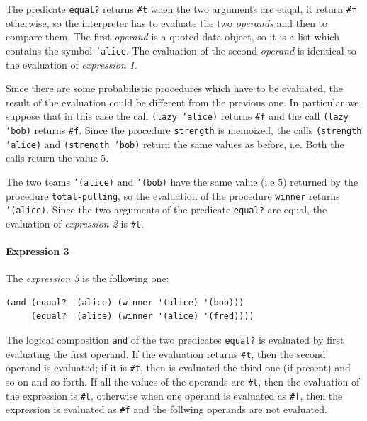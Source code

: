 \begin{itemize}
        The predicate \texttt{equal?} returns \texttt{\#t} when the two arguments are euqal, it return \texttt{\#f} otherwise, so
        the interpreter has to evaluate the two \textit{operands} and then to compare them. The first \textit{operand} is a quoted
        data object, so it is a list which contains the symbol \texttt{'alice}. The evaluation of the second \textit{operand} is
        identical to the evaluation of \textit{expression 1}. 
        
        Since there are some probabilistic procedures which have to be evaluated, the result of the evaluation could be different 
        from the previous one. In particular we suppose that in this case the call \texttt{(lazy 'alice)} returns \texttt{\#f} and 
        the call \texttt{(lazy 'bob)} returns \texttt{\#f}.
        Since the procedure \texttt{strength} is memoized, the calls \texttt{(strength 'alice)} and \texttt{(strength 'bob)} return
        the same values as before, i.e. Both the calls return the value $5$.
        
        The two teams \texttt{'(alice)} and \texttt{'(bob)} have the same value (i.e $5$) returned by the procedure 
        \texttt{total-pulling}, so the evaluation of the procedure \texttt{winner} returns \texttt{'(alice)}.
        Since the two arguments of the predicate \texttt{equal?} are equal, the evaluation of \textit{expression 2} is \texttt{\#t}.


        \paragraph*{Expression 3} The \textit{expression 3} is the following one: 
        \begin{lstlisting}
(and (equal? '(alice) (winner '(alice) '(bob)))
     (equal? '(alice) (winner '(alice) '(fred))))
        \end{lstlisting}

        The logical composition \texttt{and} of the two predicates \texttt{equal?} is evaluated by first evaluating the first operand.
        If the evaluation returns \texttt{\#t}, then the second operand is evaluated; if it is \texttt{\#t}, then is evaluated the 
        third one (if present) and so on and so forth.
        If all the values of the operands are \texttt{\#t}, then the evaluation of the expression is \texttt{\#t}, otherwise when
        one operand is evaluated as \texttt{\#f}, then the expression is evaluated as \texttt{\#f} and the follwing operands are not
        evaluated.
        

\end{itemize}
